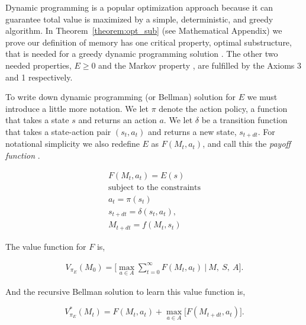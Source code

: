 \documentclass[12pt]{article}
\begin{document}
Dynamic programming is a popular optimization approach because it can guarantee total value is maximized by a simple, deterministic, and greedy algorithm. In Theorem~\ref{theorem:opt_sub} (see Mathematical Appendix) we prove our definition of memory has one critical property, optimal substructure, that is needed for a greedy dynamic programming solution \cite{Bellmann1954,Roughgarden2019}. The other two needed properties, $E \ge 0$ and the Markov property \cite{Bellmann1954,Roughgarden2019}, are fulfilled by the Axioms 3 and 1 respectively. 

To write down dynamic programming (or Bellman) solution for $E$ we must introduce a little more notation. We let $\pi$ denote the action policy, a function that takes a state $s$ and returns an action $a$. We let $\delta$ be a transition function that takes a state-action pair $(s_{t},a_t)$ and returns a new state, $s_{t+dt}$. For notational simplicity we also redefine $E$ as $F(M_{t}, a_t)$, and call this the \textit{payoff function} \cite{Bellmann1954}.
 
\begin{equation}
	\begin{split}\label{eq:payout} 
		F(M_{t}, a_t) = E(s)\\
		\text{subject to the constraints} \\
		a_{t} = \pi(s_t) \\
		s_{t+dt} = \delta(s_{t}, a_t),\\
		M_{t+dt} = f(M_{t}, s_{t}) 
	\end{split}
\end{equation}

\noindent The value function for $F$ is,

\begin{equation}\label{eq:V_E} 
	\begin{split}
		V_{\pi_E}(M_0) = \Big [ \max_{a \in A} \sum_{t=0}^{\infty} F(M_t, a_t) \ \Big | \ M,\ S,\ A \Big ]. 
	\end{split}
\end{equation}

\noindent And the recursive Bellman solution to learn this value function is,

\begin{equation}\label{eq:bellman_iter} 
	V^*_{\pi_E}(M_{t}) = F(M_{t}, a_{t}) + \max_{a \in A} \Big [ F(M_{t+dt}, a_t) \Big ].
\end{equation}
\end{document}
